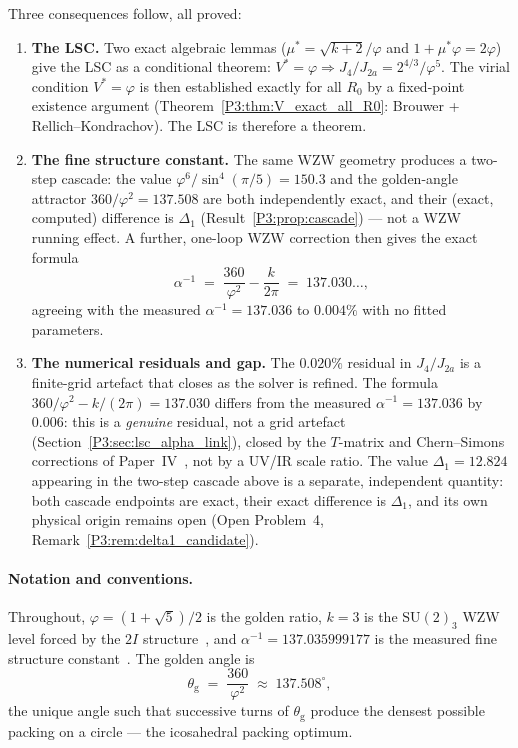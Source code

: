 \documentclass[11pt,a4paper]{article}
\theoremstyle{definition}
\theoremstyle{remark}
\newcommand{\vp}{\varphi}
\newcommand{\aInv}{\alpha^{-1}}
\newcommand{\thetaG}{\theta_{\mathrm{g}}}
\begin{document}
Three consequences follow, all proved:
\begin{enumerate}[noitemsep]
  \item \textbf{The LSC.}  Two exact algebraic lemmas ($\mu^* = \sqrt{k+2}/\vp$
    and $1+\mu^*\vp = 2\vp$) give the LSC as a conditional theorem: $V^*=\vp
    \Rightarrow J_4/J_{2a} = 2^{4/3}/\vp^5$.  The virial condition $V^*=\vp$ is
    then established exactly for all $R_0$ by a fixed-point existence argument
    (Theorem~\ref{P3:thm:V_exact_all_R0}: Brouwer + Rellich--Kondrachov).
    The LSC is therefore a theorem.

  \item \textbf{The fine structure constant.}  The same WZW geometry produces a
    two-step cascade: the value $\vp^6/\sin^4(\pi/5) = 150.3$ and the
    golden-angle attractor $360/\vp^2 = 137.508$ are both independently
    exact, and their (exact, computed) difference is $\Delta_1$
    (Result~\ref{P3:prop:cascade}) --- not a WZW running effect.
    A further, one-loop WZW correction then gives the exact formula
    \begin{equation*}
      \aInv \;=\; \frac{360}{\vp^2} - \frac{k}{2\pi} \;=\; 137.030\ldots,
    \end{equation*}
    agreeing with the measured $\aInv = 137.036$ to $0.004\%$ with no fitted
    parameters.

  \item \textbf{The numerical residuals and gap.}
    The $0.020\%$ residual in $J_4/J_{2a}$ is a finite-grid artefact that
    closes as the solver is refined.  The formula $360/\vp^2 - k/(2\pi) = 137.030$
    differs from the measured $\aInv = 137.036$ by $0.006$: this is a
    \emph{genuine} residual, not a grid artefact (Section~\ref{P3:sec:lsc_alpha_link}),
    closed by the $T$-matrix and Chern--Simons corrections of
    Paper~IV~\cite{Paper4}, not by a UV/IR scale ratio.  The value
    $\Delta_1 = 12.824$ appearing in the two-step cascade above is a
    separate, independent quantity: both cascade endpoints are exact, their
    exact difference is $\Delta_1$, and its own physical origin remains
    open (Open Problem~4, Remark~\ref{P3:rem:delta1_candidate}).
\end{enumerate}

\paragraph{Notation and conventions.}
Throughout, $\vp = (1+\sqrt{5})/2$ is the golden ratio,
$k=3$ is the $\mathrm{SU}(2)_3$ WZW level forced by the $2I$
structure~\cite{Paper1}, and $\aInv = 137.035999177$ is the
measured fine structure constant~\cite{PDG2024}.
The golden angle is
\begin{equation}
  \thetaG \;=\; \frac{360}{\vp^2} \;\approx\; 137.508^\circ,
  \label{P3:eq:golden_angle}
\end{equation}
the unique angle such that successive turns of $\thetaG$ produce the
densest possible packing on a circle --- the icosahedral packing optimum.
\end{document}
